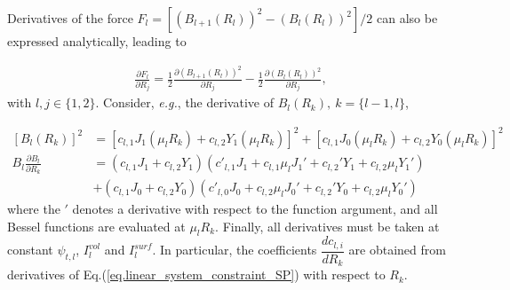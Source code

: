 Derivatives of the force $F_l= [(B_{l+1}(R_l))^2-(B_l(R_l))^2] / 2$ can also be expressed analytically, leading to

\begin{align}
	\frac{\partial F_l}{\partial R_j} = \frac{1}{2} \frac{\partial \left(B_{l+1}(R_l)\right)^2}{\partial R_j} - \frac{1}{2} \frac{\partial \left(B_{l}(R_l)\right)^2}{\partial R_j},
\end{align}
with $l,j\in\{1,2\}$. Consider, \textit{e.g.}, the derivative of $B_l(R_k),\ k=\{l-1,l\}$,

\begin{align}
	\left[B_l(R_k)\right]^2 &= \left[c_{l,1}J_1(\mu_lR_k)+c_{l,2}Y_1(\mu_lR_k)\right]^2 + \left[c_{l,1}J_0(\mu_lR_k)+c_{l,2}Y_0(\mu_lR_k)\right]^2  \\
	B_l\frac{\partial B_l}{\partial R_k} &= (c_{l,1}J_1 + c_{l,2}Y_1)(c'_{l,1}J_1 + c_{l,1}\mu_lJ_1' + c_{l,2}'Y_1 + c_{l,2}\mu_lY_1') \\
	&+ (c_{l,1}J_0 + c_{l,2}Y_0)(c'_{l,0}J_0 + c_{l,2}\mu_lJ_0' + c_{l,2}'Y_0 + c_{l,2}\mu_lY_0')
\end{align}
where the $'$ denotes a derivative with respect to the function argument, and all Bessel functions are evaluated at $\mu_lR_k$. Finally, all derivatives must be taken at constant $\psi_{t,l}$, $I^{vol}_l$ and $I^{surf}_l$. In particular, the coefficients $\dfrac{dc_{l,i}}{dR_k}$ are obtained from derivatives of Eq.(\ref{eq.linear_system_constraint_SP}) with respect to $R_k$.





